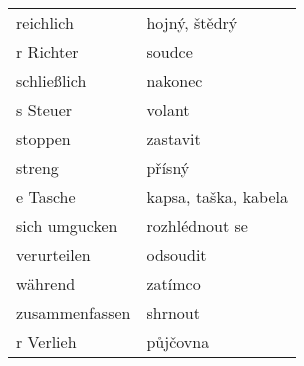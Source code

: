 \documentclass{article}
\begin{document}
\begin{tabular}{ p{5cm}|p{5cm}  }
    reichlich & hojný, štědrý\\
    r Richter & soudce\\
    schlie{\ss}lich & nakonec\\
    s Steuer & volant\\
    stoppen & zastavit\\
    streng & přísný\\
    e Tasche & kapsa, taška, kabela\\
    sich umgucken & rozhlédnout se\\
    verurteilen & odsoudit\\
    während & zatímco\\
    zusammenfassen & shrnout\\
    r Verlieh & půjčovna\\
\end{tabular}
\end{document}
